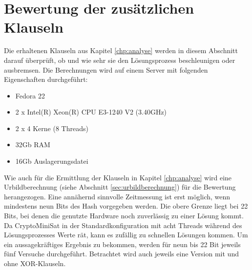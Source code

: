 \chapter{Bewertung der zusätzlichen Klauseln}
\label{chp:bewertung}

Die erhaltenen Klauseln aus Kapitel \ref{chp:analyse} werden in diesem Abschnitt darauf überprüft,
ob und wie sehr sie den Lösungsprozess beschleunigen oder ausbremsen. Die Berechnungen wird auf einem
Server mit folgenden Eigenschaften durchgeführt:
\begin{itemize}
  \item Fedora 22
  \item 2 x Intel(R) Xeon(R) CPU E3-1240 V2 (3.40GHz)
  \item 2 x 4 Kerne (8 Threads)
  \item 32Gb RAM
  \item 16Gb Auslagerungsdatei
\end{itemize}

Wie auch für die Ermittlung der Klauseln in Kapitel \ref{chp:analyse} wird eine Urbildberechnung (siehe Abschnitt \ref{sec:urbildberechnung})
für die Bewertung herangezogen. Eine annähernd sinnvolle Zeitmessung ist erst möglich, wenn mindestens neun Bits des Hash vorgegeben werden.
Die obere Grenze liegt bei 22 Bits, bei denen die genutzte Hardware noch zuverlässig zu einer Lösung kommt. Da CryptoMiniSat in der Standardkonfiguration
mit acht Threads während des Lösungsprozesses Werte rät, kann es zufällig zu schnellen Lösungen kommen. Um ein aussagekräftiges Ergebnis
zu bekommen, werden für neun bis 22 Bit jeweils fünf Versuche durchgeführt. Betrachtet wird auch jeweils eine Version mit und ohne XOR-Klauseln.

